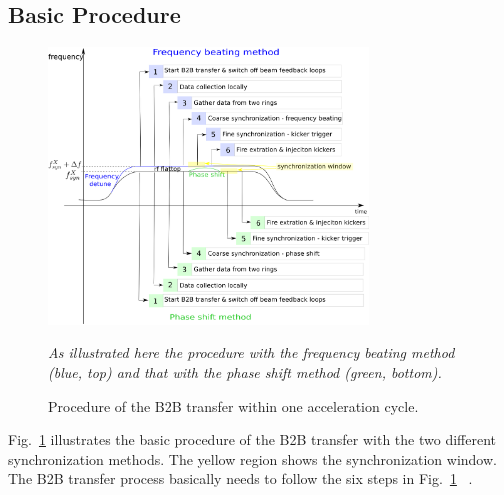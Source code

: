\subsection{Basic Procedure}
\begin{figure}[!htb]
   \centering   
   \includegraphics*[width=85mm]{procedure.eps}
   \caption{Procedure of the B2B transfer within one acceleration cycle.}
	{\textsl{\small{As illustrated here the procedure with the frequency beating method (blue, top) and that with the phase shift method (green, bottom).}}}
   \label{procedure}
\end{figure}

Fig.~\ref{procedure} illustrates the basic procedure of the B2B transfer with the two different synchronization methods. The yellow region shows the synchronization window. The B2B transfer process basically needs to follow the six steps in Fig.~\ref{procedure} ~\cite{bai_f-tc-c-05_2016}.

